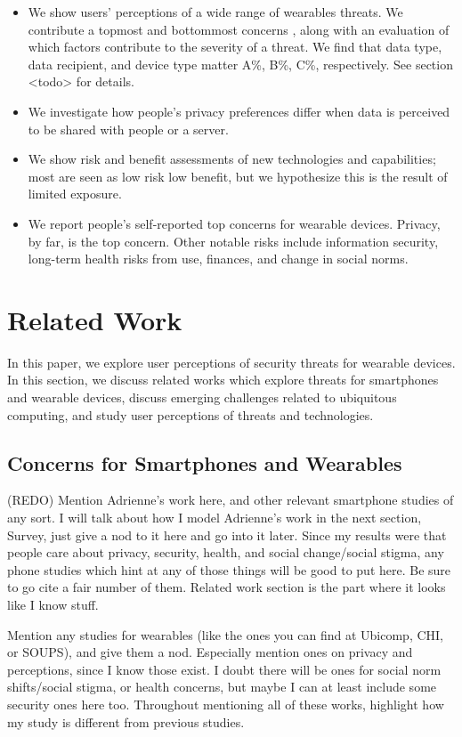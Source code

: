 \documentclass{acm_proc_article-sp}
\begin{document}
\begin{itemize} \itemsep1pt \parskip0pt 
\item We show users' perceptions of a wide range of wearables threats. We contribute a topmost and bottommost concerns , along with an evaluation of which factors contribute to the severity of a threat. We find that data type, data recipient, and device type matter A\%, B\%, C\%, respectively. See section <todo> for details.  
\item We investigate how people's privacy preferences differ when data is perceived to be shared with people or a server.
\item We show risk and benefit assessments of new technologies and capabilities; most are seen as low risk low benefit, but we hypothesize this is  the result of limited exposure. 
\item We report people's self-reported top concerns for wearable devices. Privacy, by far, is the top concern. Other notable risks include information security, long-term health risks from use, finances, and change in social norms. 
\end{itemize}


\section{Related Work}
In this paper, we explore user perceptions of security threats for wearable devices. In this section, we discuss related works which explore threats for smartphones and wearable devices, discuss emerging challenges related to ubiquitous computing, and study user perceptions of threats and technologies. 

\subsection{Concerns for Smartphones and Wearables}
(REDO) Mention Adrienne's work here, and other relevant smartphone studies of any sort. I will talk about how I model Adrienne's work in the next section, Survey, just give a nod to it here and go into it later. Since my results were that people care about privacy, security, health, and social change/social stigma, any phone studies which hint at any of those things will be good to put here. Be sure to go cite a fair number of them. Related work section is the part where it looks like I know stuff. 

Mention any studies for wearables (like the ones you can find at Ubicomp, CHI, or SOUPS), and give them a nod. Especially mention ones on privacy and perceptions, since I know those exist. I doubt there will be ones for social norm shifts/social stigma, or health concerns, but maybe I can at least include some security ones here too. Throughout mentioning all of these works, highlight how my study is different from previous studies. 
\end{document}
